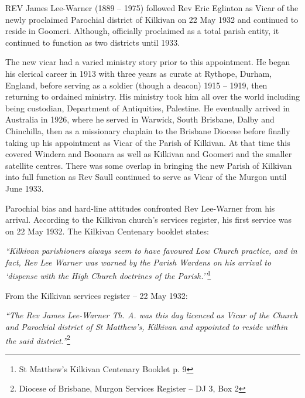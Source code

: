 \lettrine[lines=3]{R}{EV}
 James Lee-Warner (1889 -- 1975) followed Rev Eric Eglinton as Vicar of the newly proclaimed Parochial district of Kilkivan on 22 May 1932 and continued to reside in Goomeri. Although, officially proclaimed as a total parish entity, it continued to function as two districts until 1933.

The new vicar had a varied ministry story prior to this appointment. He began his clerical career in 1913 with three years as curate at Rythope, Durham, England, before serving as a soldier (though a deacon) 1915 -- 1919, then returning to ordained ministry. His ministry took him all over the world including being custodian, Department of Antiquities, Palestine. He eventually arrived in Australia in 1926, where he served in Warwick, South Brisbane, Dalby and Chinchilla, then as a missionary chaplain to the Brisbane Diocese before finally taking up his appointment as Vicar of the Parish of Kilkivan. At that time this covered Windera and Boonara as well as Kilkivan and Goomeri and the smaller satellite centres. There was some overlap in bringing the new Parish of Kilkivan into full function as Rev Saull continued to serve as Vicar of the Murgon until June 1933.



Parochial bias and hard-line attitudes confronted Rev Lee-Warner from his arrival. According to the Kilkivan church's services register, his first service was on 22 May 1932. The Kilkivan Centenary booklet states:



\emph{``Kilkivan parishioners always seem to have favoured Low Church practice, and in fact, Rev Lee Warner was warned by the Parish Wardens on his arrival to `dispense with the High Church doctrines of the Parish.''}\footnote{St Matthew's Kilkivan Centenary Booklet p. 9}


From the Kilkivan services register -- 22 May 1932:



\emph{``The Rev James Lee-Warner Th. A. was this day licenced as Vicar of the Church and Parochial district of St Matthew's, Kilkivan and appointed to reside within the said district.''}\footnote{Diocese of Brisbane, Murgon Services Register -- DJ 3, Box 2}


